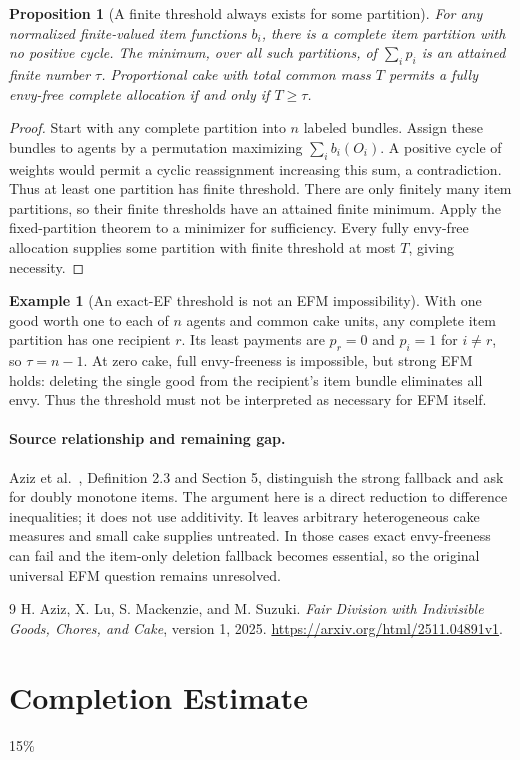 \documentclass[11pt]{article}
\newtheorem{proposition}{Proposition}
\theoremstyle{definition}
\newtheorem{example}{Example}
\theoremstyle{remark}
\begin{document}
\begin{proposition}[A finite threshold always exists for some partition]
For any normalized finite-valued item functions $b_i$, there is a complete item partition with no positive cycle. The minimum, over all such partitions, of $\sum_i p_i$ is an attained finite number $\tau$. Proportional cake with total common mass $T$ permits a fully envy-free complete allocation if and only if $T\geq\tau$.
\end{proposition}
\begin{proof}
Start with any complete partition into $n$ labeled bundles. Assign these bundles to agents by a permutation maximizing $\sum_i b_i(O_i)$. A positive cycle of weights would permit a cyclic reassignment increasing this sum, a contradiction. Thus at least one partition has finite threshold. There are only finitely many item partitions, so their finite thresholds have an attained finite minimum. Apply the fixed-partition theorem to a minimizer for sufficiency. Every fully envy-free allocation supplies some partition with finite threshold at most $T$, giving necessity.
\end{proof}

\begin{example}[An exact-EF threshold is not an EFM impossibility]
With one good worth one to each of $n$ agents and common cake units, any complete item partition has one recipient $r$. Its least payments are $p_r=0$ and $p_i=1$ for $i\neq r$, so $\tau=n-1$. At zero cake, full envy-freeness is impossible, but strong EFM holds: deleting the single good from the recipient's item bundle eliminates all envy. Thus the threshold must not be interpreted as necessary for EFM itself.
\end{example}

\paragraph{Source relationship and remaining gap.}
Aziz et al.~\cite{source}, Definition 2.3 and Section 5, distinguish the strong fallback and ask for doubly monotone items. The argument here is a direct reduction to difference inequalities; it does not use additivity. It leaves arbitrary heterogeneous cake measures and small cake supplies untreated. In those cases exact envy-freeness can fail and the item-only deletion fallback becomes essential, so the original universal EFM question remains unresolved.

\begin{thebibliography}{9}
 H. Aziz, X. Lu, S. Mackenzie, and M. Suzuki.
\emph{Fair Division with Indivisible Goods, Chores, and Cake}, version 1, 2025.
\url{https://arxiv.org/html/2511.04891v1}.
\end{thebibliography}

\section{Completion Estimate}
15\%
\end{document}
